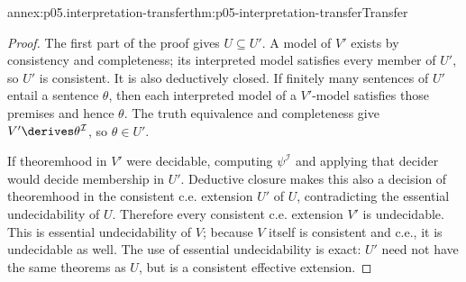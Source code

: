 \begin{annexitem}{annex:p05.interpretation-transfer}{thm:p05-interpretation-transfer}{Transfer}
\begin{proof}
The first part of the proof gives \(U\subseteq U'\). A model of
\(V'\) exists by consistency and completeness; its interpreted model
satisfies every member of \(U'\), so \(U'\) is consistent. It is also
deductively closed. If finitely many sentences of \(U'\) entail a
sentence \(\theta\), then each interpreted model of a \(V'\)-model
satisfies those premises and hence \(\theta\). The truth equivalence
and completeness give \(V'\derives\theta^{\mathcal I}\), so
\(\theta\in U'\).

If theoremhood in \(V'\) were decidable, computing
\(\psi^{\mathcal I}\) and applying that decider would decide membership
in \(U'\). Deductive closure makes this also a decision of theoremhood
in the consistent c.e. extension \(U'\) of \(U\), contradicting the
essential undecidability of \(U\). Therefore every consistent c.e.
extension \(V'\) is undecidable. This is essential undecidability of
\(V\); because \(V\) itself is consistent and c.e., it is undecidable
as well. The use of essential undecidability is exact: \(U'\) need not
have the same theorems as \(U\), but is a consistent effective extension.
\end{proof}
\end{annexitem}
